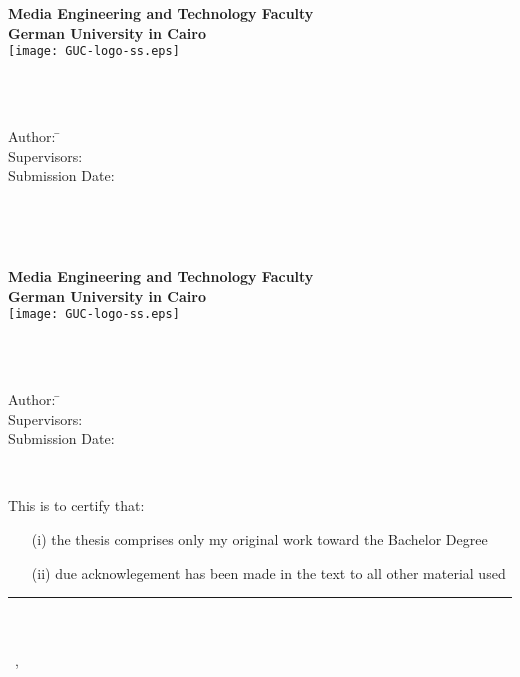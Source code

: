 \newcommand{\titlePage}{

	\thispagestyle{empty}
	\begin{center}
		\textbf{Media Engineering and Technology Faculty}\\[1mm]
		\textbf{German University in Cairo}\\[1mm]
		\texttt{[image: GUC-logo-ss.eps]}

		\vspace{2cm}
		\doublespacing
		{\Huge \textbf{\titleOfThesisOne}}\\
		\singlespacing
		\vspace{2cm}
		{\large \textbf{\typeOfThesis}}\\

		\vfill
		\parbox{1cm}{
			\begin{large}
				\begin{tabbing}
					Author: \hspace{2cm}
					\=\authorOfThesis\\[2mm]
					Supervisors:
					\>\supervisorOne\\[2mm]
					Submission Date:
					\>\submissionDate\\
				\end{tabbing}
			\end{large}
		}\\
	\end{center}
	\clearpage
}
\titlePage
\thispagestyle{empty}\ \clearpage
\titlePage
\thispagestyle{empty}
This is to certify that:
\begin{itemize}
	\item[(i)] the thesis comprises only my original work toward the Bachelor Degree
	\item[(ii)] due acknowlegement has been made in the text to all other material used
\end{itemize}

\vspace{2cm}
\begin{flushright}
	\rule[0mm]{6cm}{0.2mm}\\
	\authorOfThesis\\
	\submissionDay~\submissionMonth,~\submissionYear\\
\end{flushright}
\clearpage
